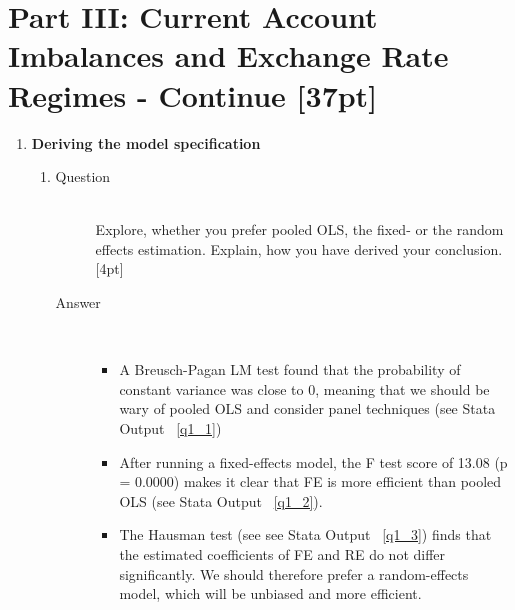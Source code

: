 \documentclass{article}
\begin{document}
\section{Part III: Current Account Imbalances and Exchange Rate Regimes - Continue [37pt]}

\begin{enumerate}
  \item \textbf{Deriving the model specification}
  \begin{enumerate}[label=(\alph*)]
    \item %
    \begin{description}
      \item[Question] \hfill \\
      Explore, whether you prefer pooled OLS, the fixed- or the random effects estimation. Explain, how you have derived your conclusion. [4pt]
      \item[Answer] \hfill \\
      \begin{figure}[h]
      
      \end{figure}
      
      \begin{itemize}
      \item A Breusch-Pagan LM test found that the probability of constant variance was close to 0, meaning that we should be wary of pooled OLS and consider panel techniques (see Stata Output ~\ref{q1_1})
      
      \begin{figure}[h]
      
      \end{figure}
      
      \item After running a fixed-effects model, the F test score of 13.08 (p = 0.0000) makes it clear that FE is more efficient than pooled OLS (see Stata Output ~\ref{q1_2}).
      
      \begin{figure}[h]
      
      \end{figure}
      
      \item The Hausman test (see see Stata Output ~\ref{q1_3}) finds that the estimated coefficients of FE and RE do not differ significantly. We should therefore prefer a random-effects model, which will be unbiased and more efficient.
      

\end{itemize}
\end{description}
\end{enumerate}
\end{enumerate}
\end{document}
